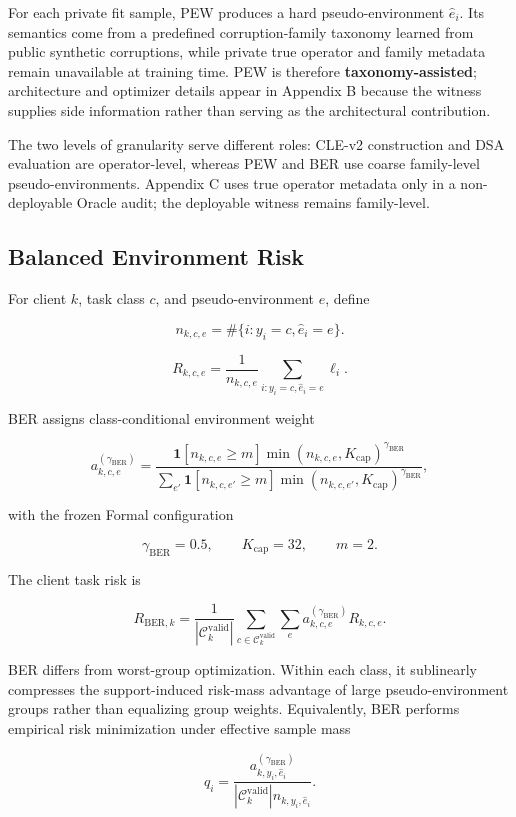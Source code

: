 For each private fit sample, PEW produces a hard pseudo-environment \(\hat e_i\). Its semantics come from a predefined corruption-family taxonomy learned from public synthetic corruptions, while private true operator and family metadata remain unavailable at training time. PEW is therefore \textbf{taxonomy-assisted}; architecture and optimizer details appear in Appendix B because the witness supplies side information rather than serving as the architectural contribution.

The two levels of granularity serve different roles: CLE-v2 construction and DSA evaluation are operator-level, whereas PEW and BER use coarse family-level pseudo-environments. Appendix C uses true operator metadata only in a non-deployable Oracle audit; the deployable witness remains family-level.

\subsection{Balanced Environment Risk}

For client \(k\), task class \(c\), and pseudo-environment \(e\), define

\[
n_{k,c,e}=\#\{i:y_i=c,\hat e_i=e\}.
\]

\[
R_{k,c,e}=\frac1{n_{k,c,e}}\sum_{i:y_i=c,\hat e_i=e}\ell_i.
\]

BER assigns class-conditional environment weight

\[
a^{(\gamma_{\mathrm{BER}})}_{k,c,e}
=
\frac{
\mathbf 1[n_{k,c,e}\ge m]
\min(n_{k,c,e},K_{\mathrm{cap}})^{\gamma_{\mathrm{BER}}}
}{
\sum_{e'}
\mathbf 1[n_{k,c,e'}\ge m]
\min(n_{k,c,e'},K_{\mathrm{cap}})^{\gamma_{\mathrm{BER}}}
},
\]

with the frozen Formal configuration

\[
\gamma_{\mathrm{BER}}=0.5,\qquad K_{\mathrm{cap}}=32,\qquad m=2.
\]

The client task risk is

\[
R_{\mathrm{BER},k}
=
\frac1{|\mathcal C_k^{\mathrm{valid}}|}
\sum_{c\in\mathcal C_k^{\mathrm{valid}}}
\sum_e a^{(\gamma_{\mathrm{BER}})}_{k,c,e}R_{k,c,e}.
\]

BER differs from worst-group optimization. Within each class, it sublinearly compresses the support-induced risk-mass advantage of large pseudo-environment groups rather than equalizing group weights. Equivalently, BER performs empirical risk minimization under effective sample mass

\[
q_i=
\frac{a^{(\gamma_{\mathrm{BER}})}_{k,y_i,\hat e_i}}
{|\mathcal C_k^{\mathrm{valid}}|n_{k,y_i,\hat e_i}}.
\]

